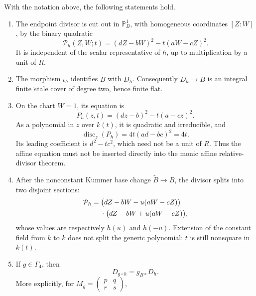 \begin{theorem}
\label{thm:forced-projective-quadratic}
With the notation above, the following statements hold.
\begin{enumerate}
\item The endpoint divisor is cut out in \(\mathbb P^1_B\), with homogeneous
coordinates \([Z:W]\), by the binary quadratic
\begin{equation}
 \mathcal P_h(Z,W;t)
  =(dZ-bW)^2-t(aW-cZ)^2.
 \label{eq:forced-homogeneous-quadratic}
\end{equation}
It is independent of the scalar representative of \(h\), up to multiplication
by a unit of \(R\).
\item The morphism \(\iota_h\) identifies \(\widetilde B\) with \(D_h\).
Consequently \(D_h\to B\) is an integral finite \(\acute{e}\)tale cover of
degree two, hence finite flat.
\item On the chart \(W=1\), its equation is
\begin{equation}
 P_h(z,t)=(dz-b)^2-t(a-cz)^2.
 \label{eq:forced-affine-quadratic}
\end{equation}
As a polynomial in \(z\) over \(k(t)\), it is quadratic and irreducible, and
\begin{equation}
 \operatorname{disc}_z(P_h)=4t(ad-bc)^2=4t.
 \label{eq:forced-quadratic-discriminant}
\end{equation}
Its leading coefficient is \(d^2-tc^2\), which need not be a unit of \(R\).
Thus the affine equation must not be inserted directly into the monic affine
relative-divisor theorem.
\item After the nonconstant Kummer base change
\(\widetilde B\to B\), the divisor splits into two disjoint sections:
\begin{align}
 \mathcal P_h
  ={}&\bigl(dZ-bW-u(aW-cZ)\bigr)\notag\\
    &\cdot\bigl(dZ-bW+u(aW-cZ)\bigr),
 \label{eq:forced-quadratic-splitting}
\end{align}
whose values are respectively \(h(u)\) and \(h(-u)\).
Extension of the constant field from \(k\) to \(\overline k\) does not split
the generic polynomial: \(t\) is still nonsquare in \(\overline k(t)\).
\item If \(g\in\Gamma_4\), then
\begin{equation}
 D_{g\circ h}=g_{B*}D_h.
 \label{eq:register-divisor-equivariance}
\end{equation}
More explicitly, for
\(M_g=\left(\begin{smallmatrix}p&q\\r&s\end{smallmatrix}\right)\),

\end{enumerate}
\end{theorem}
